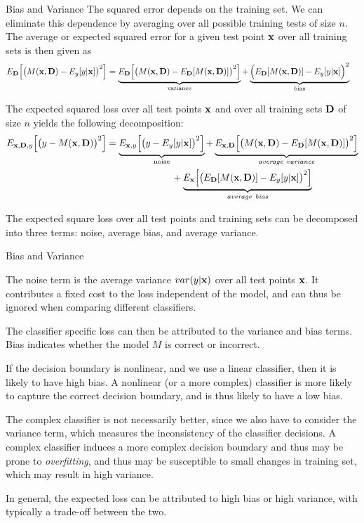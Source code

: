 \begin{frame}{Bias and Variance}
  \small
The squared error depends on the training set. We can eliminate
this dependence by averaging over all possible training tests of
size $n$. The average or expected squared error for a given test
point $\mathbf{x}$ over all training sets is then given as
\begin{align*}
 E_{\mathbf{D}}\Bigl[\bigl(M(\mathbf{x}, \mathbf{D}) - E_y[y|\mathbf{x}]\bigr)^2\Big]
&  =  \underbrace{E_{\mathbf{D}}\Bigl[ \bigl(M(\mathbf{x},\mathbf{D}) -
    E_{\mathbf{D}}[M(\mathbf{x},\mathbf{D})]\bigr)^2\Bigr]}_{\rm variance} +
    \underbrace{\Bigl(E_{\mathbf{D}}[M(\mathbf{x}, \mathbf{D})] - E_y[y|\mathbf{x}]\Bigr)^2}_{\rm bias}
\end{align*}

The
expected squared loss over all test points $\mathbf{x}$ and over all
training sets $\mathbf{D}$ of size $n$ yields the following decomposition:
\begin{align*}
E_{\mathbf{x},\mathbf{D},y}\Bigl[ \bigl(y - M(\mathbf{x}, \mathbf{D})\bigr)^2\Bigr]
  & = \underbrace{E_{\mathbf{x},y}\Bigl[\bigl(y - E_y[y|\mathbf{x}]\bigr)^2 \Bigr]}_{\rm noise} +
\underbrace{E_{\mathbf{x},\mathbf{D}}\Bigl[ \bigl(M(\mathbf{x}, \mathbf{D}) -
E_{\mathbf{D}}[M(\mathbf{x}, \mathbf{D})]\bigr)^2\Bigr]}_{{\it average\ variance}}\\
    &\qquad \quad \qquad \qquad +
    \underbrace{E_{\mathbf{x}}\Bigl[\bigl(E_{\mathbf{D}}[M(\mathbf{x}, \mathbf{D})] -
    E_y[y|\mathbf{x}]\bigr)^2\Bigr]}_{{\it average\ bias}}
\end{align*}

The expected square loss over all test points and training
sets can be decomposed into three terms: noise, average bias, and
average variance. 
\end{frame}

\begin{frame}{Bias and Variance}
\small

The noise term is the average variance
$var(y|\mathbf{x})$ over all test points $\mathbf{x}$. It contributes a f\/{i}xed
cost to the loss independent of the model, and can thus be ignored
when comparing different classif\/{i}ers. 

\medskip
The classif\/{i}er specif\/{i}c loss
can then be attributed to the variance and bias terms. 
Bias indicates whether the model $M$ is correct or incorrect. 

\medskip
If the decision boundary is
nonlinear, and we use a linear classif\/{i}er, then it is likely to
have high bias. A nonlinear (or a
more complex) classif\/{i}er is more likely to capture the correct
decision boundary, and is thus likely to have a low bias.

\medskip
The complex
classif\/{i}er is not necessarily better, since we also have to consider
the variance term, which measures the inconsistency of the
classif\/{i}er decisions. A complex classif\/{i}er induces a more complex
decision boundary and thus may be prone to {\em overf\/{i}tting},
and thus may be
susceptible to small changes in training set, which may result in
high variance.

\medskip
In general, the expected loss can be attributed to high bias or
high variance, with typically a trade-off between the two.
\end{frame}



